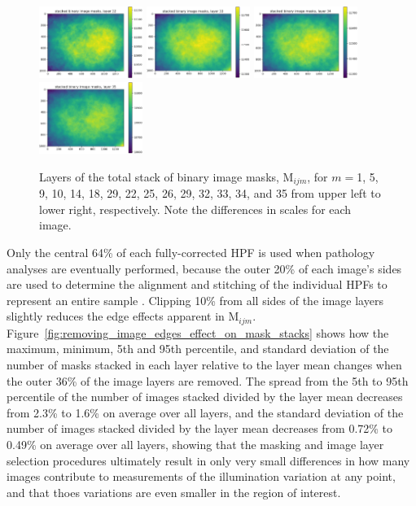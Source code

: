 \documentclass[letterpaper,11pt]{article}
\newcommand{\reffig}[1]{Figure~\ref{#1}}
\newcommand{\Mu}{\mathrm{M}}
\begin{document}
\begin{figure}[!ht]
\includegraphics[width=0.3\textwidth]{images/measuring_flatfield_corrections/mask_stack_layers/mask_stack_layer_32}
\includegraphics[width=0.3\textwidth]{images/measuring_flatfield_corrections/mask_stack_layers/mask_stack_layer_33}
\includegraphics[width=0.3\textwidth]{images/measuring_flatfield_corrections/mask_stack_layers/mask_stack_layer_34}
\includegraphics[width=0.3\textwidth]{images/measuring_flatfield_corrections/mask_stack_layers/mask_stack_layer_35}
\caption{\footnotesize Layers of the total stack of binary image masks, $\Mu_{ijm}$, for $m=$1, 5, 9, 10, 14, 18, 29, 22, 25, 26, 29, 32, 33, 34, and 35 from upper left to lower right, respectively. Note the differences in scales for each image.}
\label{fig:mask_stack_layers}
\end{figure}

Only the central 64\% of each fully-corrected HPF is used when pathology analyses are eventually performed, because the outer 20\% of each image's sides are used to determine the alignment and stitching of the individual HPFs to represent an entire sample \cite{Heshy}. Clipping 10\% from all sides of the image layers slightly reduces the edge effects apparent in $\Mu_{ijm}$. \reffig{fig:removing_image_edges_effect_on_mask_stacks} shows how the maximum, minimum, 5th and 95th percentile, and standard deviation of the number of masks stacked in each layer relative to the layer mean changes when the outer 36\% of the image layers are removed. The spread from the 5th to 95th percentile of the number of images stacked divided by the layer mean decreases from 2.3\% to 1.6\% on average over all layers, and the standard deviation of the number of images stacked divided by the layer mean decreases from 0.72\% to 0.49\% on average over all layers, showing that the masking and image layer selection procedures ultimately result in only very small differences in how many images contribute to measurements of the illumination variation at any point, and that thoes variations are even smaller in the region of interest.
\end{document}
